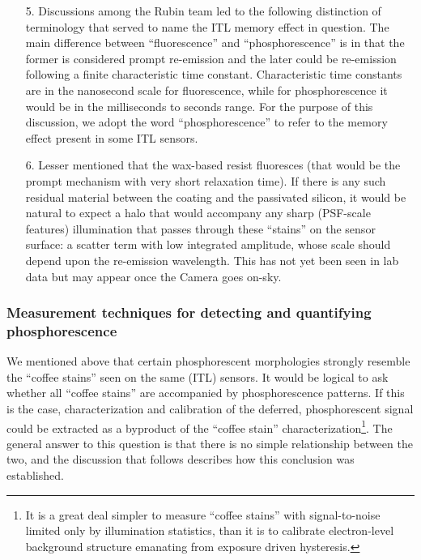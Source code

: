 \begin{itemize}
    \item[5.] Discussions among the Rubin team led to the following distinction of terminology that served to name the ITL memory effect in question. The main difference between ``fluorescence'' and ``phosphorescence'' is in that the former is considered prompt re-emission and the later could be re-emission following a finite characteristic time constant. Characteristic time constants are in the nanosecond scale for fluorescence, while for phosphorescence it would be in the milliseconds to seconds range. For the purpose of this discussion, we adopt the word ``phosphorescence'' to refer to the memory effect present in some ITL sensors.
    \item[6.] Lesser mentioned that the wax-based resist fluoresces (that would be the prompt mechanism with very short relaxation time). If there is any such residual material between the coating and the passivated silicon, it would be natural to expect a halo that would accompany any sharp (PSF-scale features) illumination that passes through these ``stains'' on the sensor surface: a scatter term with low integrated amplitude, whose scale should depend upon the re-emission wavelength. This has not yet been seen in lab data but may appear once the Camera goes on-sky.
    
\end{itemize}

\subsubsection{Measurement techniques for detecting and quantifying phosphorescence}\label{phos-measurement}
We mentioned above that certain phosphorescent morphologies strongly resemble the ``coffee stains'' seen on the same (ITL) sensors. It would be logical to ask whether all ``coffee stains'' are accompanied by phosphorescence patterns. If this is the case, characterization and calibration of the deferred, phosphorescent signal could be extracted as a byproduct of the ``coffee stain'' characterization\footnote{It is a great deal simpler to measure ``coffee stains'' with signal-to-noise limited only by illumination statistics, than it is to calibrate electron-level background structure emanating from exposure driven hysteresis.}. The general answer to this question is that there is no simple relationship between the two, and the discussion that follows describes how this conclusion was established. 


